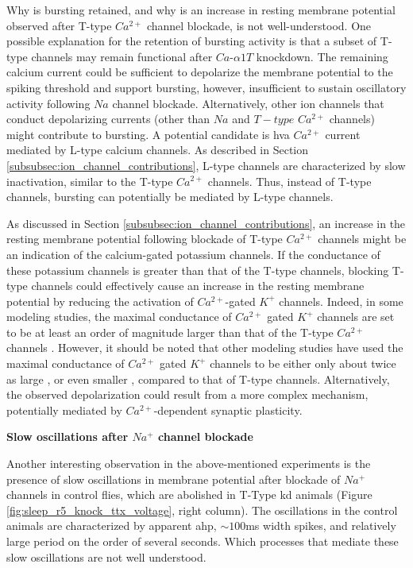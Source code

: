 \documentclass[../main.tex]{subfiles}
\begin{document}
Why is bursting retained, and why is an increase in resting membrane potential observed after T-type $Ca^{2+}$ channel blockade, is not well-understood. One possible explanation for the retention of bursting activity is that a subset of T-type channels may remain functional after $Ca$-$\alpha1T$ knockdown. The remaining calcium current could be sufficient to depolarize the membrane potential to the spiking threshold and support bursting, however, insufficient to sustain oscillatory activity following $Na$ channel blockade. Alternatively, other ion channels that conduct depolarizing currents (other than $Na$ and $T-type$ $Ca^{2+}$ channels) might contribute to bursting. A potential candidate is \gls{hva} $Ca^{2+}$ current mediated by L-type calcium channels. As described in Section \ref{subsubsec:ion_channel_contributions}, L-type channels are characterized by slow inactivation, similar to the T-type $Ca^{2+}$ channels. Thus, instead of T-type channels, bursting can potentially be mediated by L-type channels.

As discussed in Section \ref{subsubsec:ion_channel_contributions}, an increase in the resting membrane potential following blockade of T-type $Ca^{2+}$ channels might be an indication of the calcium-gated potassium channels. If the conductance of these potassium channels is greater than that of the T-type channels, blocking T-type channels could
effectively cause an increase in the resting membrane potential by reducing the activation of $Ca^{2+}$-gated $K^+$ channels. Indeed, in some modeling studies, the maximal conductance of
$Ca^{2+}$ gated $K^+$ channels are set to be at least an order of magnitude larger than that of the
T-type $Ca^{2+}$ channels \parencite{franciRobustTunableBursting2018,nowotnyProbingDynamicsIdentified2008}. However, it should be noted that other modeling studies have used the maximal conductance of $Ca^{2+}$ gated $K^+$ channels to be either only about twice as large \parencite{alonsoVisualizationCurrentsNeural2019}, or even smaller \parencite{parkMathematicalModelSubthalamic2021}, compared to that of T-type channels.
Alternatively, the observed depolarization could result from a more complex mechanism, potentially mediated by $Ca^{2+}$-dependent synaptic plasticity.

\vspace*{0.3cm}
\noindent\textbf{Slow oscillations after $Na^+$ channel blockade}

Another interesting observation in the above-mentioned experiments is the presence of slow oscillations in membrane potential after blockade of $Na^+$ channels in control flies, which are abolished in T-Type \gls{kd} animals (Figure \ref{fig:sleep_r5_knock_ttx_voltage}, right column). The oscillations in the control animals are characterized by apparent \gls{ahp}, $\sim100$ms width spikes, and relatively large period on the order of several seconds. Which processes that mediate these slow oscillations are not well understood.
\end{document}
